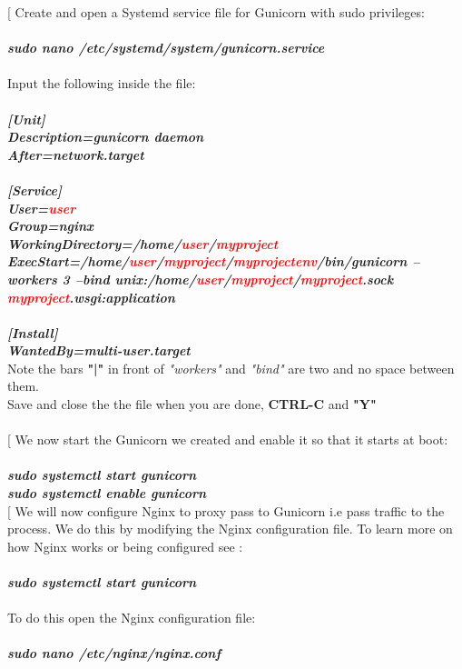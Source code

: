 \documentclass[a4paper]{article}
\makeatletter
\def\step{%
	\@ifnextchar[ \@myitem{\@noitemargtrue\@myitem[\@itemlabel]}}
\def\@myitem[#1]{\item[#1]\mbox{}\\}
\newenvironment{Step}{%
	\begin{enumerate}[label= \textbf {Step} \arabic*,align=left, leftmargin=1.0cm]%
	}{
\end{enumerate}%
}
\makeatother
\begin{document}
\begin{Step}
\step
Create and open a Systemd service file for Gunicorn with sudo privileges:\\ \\
\textbf{\emph{sudo nano /etc/systemd/system/gunicorn.service}}\\ \\
Input the following inside the file:\\\\
\textbf{\emph{[Unit]}}\\
\textbf{\emph{Description=gunicorn daemon}}\\
\textbf{\emph{After=network.target}}\\ \\
\textbf{\emph{[Service]}}\\
\textbf{\emph{User=\textcolor{red}{user}}}\\
\textbf{\emph{Group=nginx}}\\
\textbf{\emph{WorkingDirectory=/home/\textcolor{red}{user}/\textcolor{red}{myproject}}}\\
\textbf{\emph{ExecStart=/home/\textcolor{red}{user}/\textcolor{red}{myproject}/\textcolor{red}{myprojectenv}/bin/gunicorn --workers 3 --bind unix:/home/\textcolor{red}{user}/\textcolor{red}{myproject}/\textcolor{red}{myproject}.sock \textcolor{red}{myproject}.wsgi:application}}\\ \\
\textbf{\emph{[Install]}}\\
\textbf{\emph{WantedBy=multi-user.target}}\\

Note the bars \textbf{"|"} in front of \textit{"workers"} and \textit{"bind"} are two and no space between them.\\
Save and close the the file when you are done, \textbf{CTRL-C} and \textbf{"Y"}\\\\

\step
We now start the Gunicorn we created and enable it so that it starts at boot:\\ \\
\textbf{\emph{ sudo systemctl start gunicorn}}\\
\textbf{\emph{ sudo systemctl enable gunicorn}}\\

\step
We will now configure Nginx to proxy pass to Gunicorn i.e pass traffic to the process. We do this by modifying the Nginx configuration file. To learn more on how Nginx works or being configured see :\\ \\
\textbf{\emph{ sudo systemctl start gunicorn}}\\ \\
To do this open the Nginx configuration file:\\\\
\textbf{\emph{sudo nano /etc/nginx/nginx.conf}}\\


\end{Step}
\end{document}
